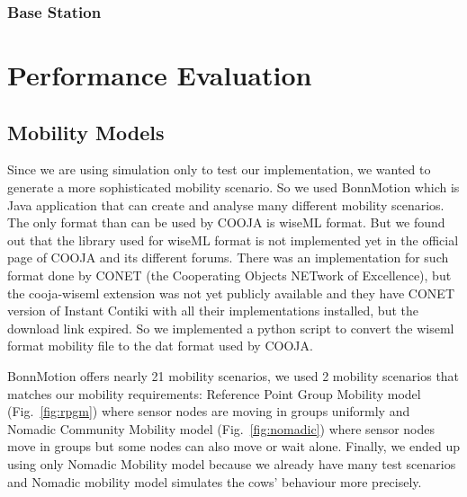 \documentclass[conference]{IEEEtran}
\begin{document}
\subsubsection{Base Station}



\section{Performance Evaluation}

\subsection{Mobility Models}

Since we are using simulation only to test our implementation, we wanted 
to generate a more sophisticated mobility scenario. So we used BonnMotion 
which is Java application that can create and analyse many different mobility 
scenarios. The only format than can be used by COOJA is wiseML format. 
But we found out that the library used  for wiseML format is not implemented 
yet in the official page of COOJA and its different forums. There was an 
implementation for such format done by CONET (the Cooperating Objects NETwork 
of Excellence), but the cooja-wiseml extension was not yet publicly available 
and they have CONET version of Instant Contiki with all their implementations 
installed, but the download link expired. So we implemented a python script to 
convert the wiseml format mobility file to the dat format used by COOJA. 

BonnMotion offers nearly 21 mobility scenarios, we used 2 mobility scenarios 
that matches our mobility requirements: Reference Point Group Mobility model 
(Fig.~\ref{fig:rpgm}) where sensor nodes are moving in groups uniformly and Nomadic Community 
Mobility model (Fig.~\ref{fig:nomadic}) where sensor nodes move in groups but some nodes can also 
move or wait alone. Finally, we ended up using only Nomadic Mobility model because 
we already have many test scenarios and Nomadic mobility model simulates the cows’ 
behaviour more precisely.
\end{document}
